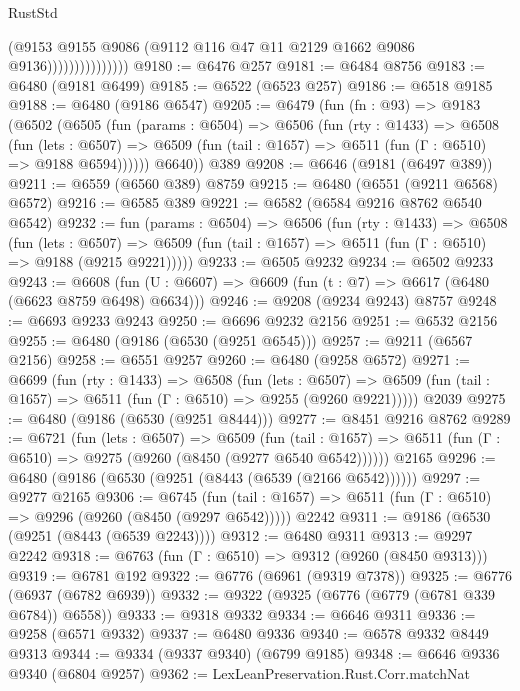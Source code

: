 \begin{lexlean}{RustStd}
\begin{coremodule}
                              (@9153
                                @9155
                                @9086
                                (@9112 @116 @47 @11 @2129 @1662 @9086 @9136)))))))))))))))
@9180 := @6476 @257
@9181 := @6484 @8756
@9183 := @6480 (@9181 @6499)
@9185 := @6522 (@6523 @257)
@9186 := @6518 @9185
@9188 := @6480 (@9186 @6547)
@9205 := @6479
    (fun (fn : @93) =>
    @9183
      (@6502
        (@6505
          (fun (params : @6504) =>
          @6506
            (fun (rty : @1433) =>
            @6508
              (fun (lets : @6507) =>
              @6509 (fun (tail : @1657) => @6511 (fun (Γ : @6510) => @9188 @6594))))))
        @6640))
    @389
@9208 := @6646 (@9181 (@6497 @389))
@9211 := @6559 (@6560 @389) @8759
@9215 := @6480 (@6551 (@9211 @6568) @6572)
@9216 := @6585 @389
@9221 := @6582 (@6584 @9216 @8762 @6540 @6542)
@9232 := fun (params : @6504) =>
  @6506
    (fun (rty : @1433) =>
    @6508
      (fun (lets : @6507) =>
      @6509 (fun (tail : @1657) => @6511 (fun (Γ : @6510) => @9188 (@9215 @9221)))))
@9233 := @6505 @9232
@9234 := @6502 @9233
@9243 := @6608 (fun (U : @6607) => @6609 (fun (t : @7) => @6617 (@6480 (@6623 @8759 @6498) @6634)))
@9246 := @9208 (@9234 @9243) @8757
@9248 := @6693 @9233 @9243
@9250 := @6696 @9232 @2156
@9251 := @6532 @2156
@9255 := @6480 (@9186 (@6530 (@9251 @6545)))
@9257 := @9211 (@6567 @2156)
@9258 := @6551 @9257
@9260 := @6480 (@9258 @6572)
@9271 := @6699
    (fun (rty : @1433) =>
    @6508
      (fun (lets : @6507) =>
      @6509 (fun (tail : @1657) => @6511 (fun (Γ : @6510) => @9255 (@9260 @9221)))))
    @2039
@9275 := @6480 (@9186 (@6530 (@9251 @8444)))
@9277 := @8451 @9216 @8762
@9289 := @6721
    (fun (lets : @6507) =>
    @6509
      (fun (tail : @1657) => @6511 (fun (Γ : @6510) => @9275 (@9260 (@8450 (@9277 @6540 @6542))))))
    @2165
@9296 := @6480 (@9186 (@6530 (@9251 (@8443 (@6539 (@2166 @6542))))))
@9297 := @9277 @2165
@9306 := @6745
    (fun (tail : @1657) => @6511 (fun (Γ : @6510) => @9296 (@9260 (@8450 (@9297 @6542)))))
    @2242
@9311 := @9186 (@6530 (@9251 (@8443 (@6539 @2243))))
@9312 := @6480 @9311
@9313 := @9297 @2242
@9318 := @6763 (fun (Γ : @6510) => @9312 (@9260 (@8450 @9313)))
@9319 := @6781 @192
@9322 := @6776 (@6961 (@9319 @7378))
@9325 := @6776 (@6937 (@6782 @6939))
@9332 := @9322 (@9325 (@6776 (@6779 (@6781 @339 @6784)) @6558))
@9333 := @9318 @9332
@9334 := @6646 @9311
@9336 := @9258 (@6571 @9332)
@9337 := @6480 @9336
@9340 := @6578 @9332 @8449 @9313
@9344 := @9334 (@9337 @9340) (@6799 @9185)
@9348 := @6646 @9336 @9340 (@6804 @9257)
@9362 := LexLeanPreservation.Rust.Corr.matchNat

\end{coremodule}
\end{lexlean}
